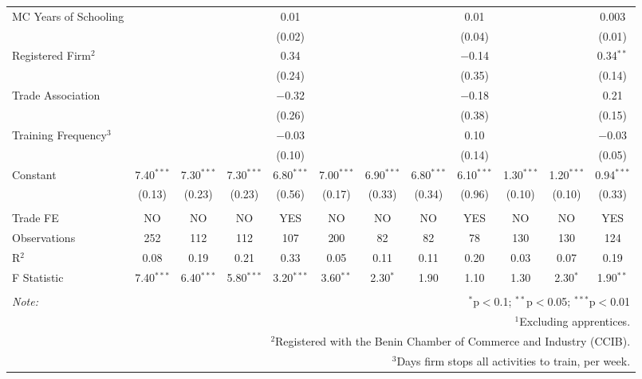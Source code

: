 \documentclass[
  11pt,
a4paper
]{article}
\begin{document}
\begin{table}[H]
\begin{tabular}{@{\extracolsep{-8pt}}lccccccccccc}
  MC Years of Schooling &  &  &  & 0.01 &  &  &  & 0.01 &  &  & 0.003 \\ 
  &  &  &  & (0.02) &  &  &  & (0.04) &  &  & (0.01) \\ 
  Registered Firm$^2$ &  &  &  & 0.34 &  &  &  & $-$0.14 &  &  & 0.34$^{**}$ \\ 
  &  &  &  & (0.24) &  &  &  & (0.35) &  &  & (0.14) \\ 
  Trade Association &  &  &  & $-$0.32 &  &  &  & $-$0.18 &  &  & 0.21 \\ 
  &  &  &  & (0.26) &  &  &  & (0.38) &  &  & (0.15) \\ 
  Training Frequency$^3$ &  &  &  & $-$0.03 &  &  &  & 0.10 &  &  & $-$0.03 \\ 
  &  &  &  & (0.10) &  &  &  & (0.14) &  &  & (0.05) \\ 
  Constant & 7.40$^{***}$ & 7.30$^{***}$ & 7.30$^{***}$ & 6.80$^{***}$ & 7.00$^{***}$ & 6.90$^{***}$ & 6.80$^{***}$ & 6.10$^{***}$ & 1.30$^{***}$ & 1.20$^{***}$ & 0.94$^{***}$ \\ 
  & (0.13) & (0.23) & (0.23) & (0.56) & (0.17) & (0.33) & (0.34) & (0.96) & (0.10) & (0.10) & (0.33) \\ 
 \hline \\[-1.8ex] 
Trade FE & NO & NO & NO & YES & NO & NO & NO & YES & NO & NO & YES \\ 
Observations & 252 & 112 & 112 & 107 & 200 & 82 & 82 & 78 & 130 & 130 & 124 \\ 
R$^{2}$ & 0.08 & 0.19 & 0.21 & 0.33 & 0.05 & 0.11 & 0.11 & 0.20 & 0.03 & 0.07 & 0.19 \\ 
F Statistic & 7.40$^{***}$ & 6.40$^{***}$ & 5.80$^{***}$ & 3.20$^{***}$ & 3.60$^{**}$ & 2.30$^{*}$ & 1.90 & 1.10 & 1.30 & 2.30$^{*}$ & 1.90$^{**}$ \\ 
\hline 
\hline \\[-1.8ex] 
\textit{Note:}  & \multicolumn{11}{r}{$^{*}$p$<$0.1; $^{**}$p$<$0.05; $^{***}$p$<$0.01} \\ 
 & \multicolumn{11}{r}{$^1$Excluding apprentices.} \\ 
 & \multicolumn{11}{r}{$^2$Registered with the Benin Chamber of Commerce and Industry (CCIB).} \\ 
 & \multicolumn{11}{r}{$^3$Days firm stops all activities to train, per week.} \\ 
\end{tabular} 
\end{table}
\end{document}
